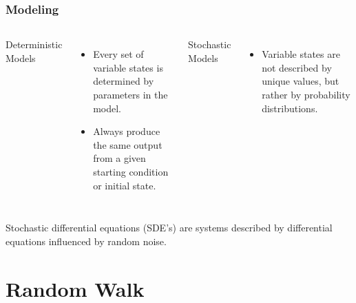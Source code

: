 \begin{frame}
\frametitle{Modeling}
\begin{columns}[t]
Deterministic Models
\begin{itemize}
\item Every set of variable states is determined by parameters in the model.
\item Always produce the same output from a given starting condition or initial state.
\end{itemize}

Stochastic Models
\begin{itemize}
\item Variable states are not described by unique values, but rather by probability distributions.
\end{itemize}
\end{columns}

\bigskip
\centering
 Stochastic differential equations (SDE’s) are systems described by differential equations influenced by random noise.
\end{frame}

\section{Random Walk}
